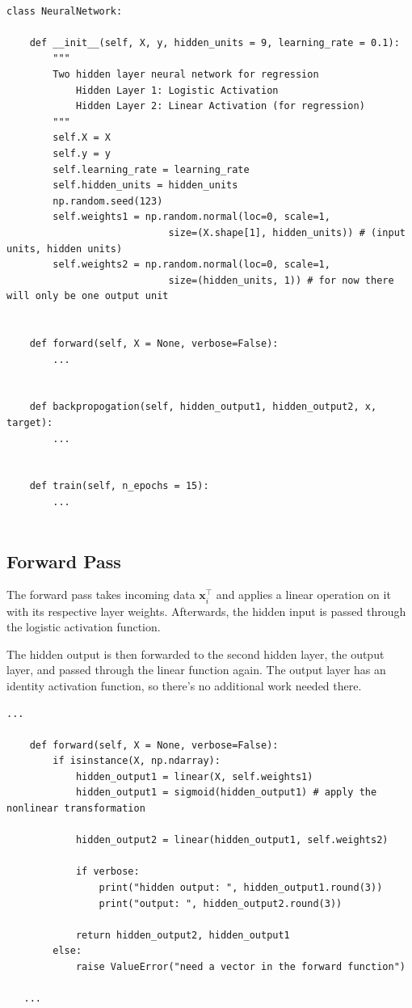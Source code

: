 \documentclass[12pt]{article}%
\begin{document}
\begin{lstlisting}

class NeuralNetwork:

    def __init__(self, X, y, hidden_units = 9, learning_rate = 0.1):
        """
        Two hidden layer neural network for regression
            Hidden Layer 1: Logistic Activation
            Hidden Layer 2: Linear Activation (for regression)
        """
        self.X = X
        self.y = y
        self.learning_rate = learning_rate
        self.hidden_units = hidden_units
        np.random.seed(123)
        self.weights1 = np.random.normal(loc=0, scale=1, 
                            size=(X.shape[1], hidden_units)) # (input units, hidden units)
        self.weights2 = np.random.normal(loc=0, scale=1, 
                            size=(hidden_units, 1)) # for now there will only be one output unit


    def forward(self, X = None, verbose=False):
		...


    def backpropogation(self, hidden_output1, hidden_output2, x, target):
		...


    def train(self, n_epochs = 15):
    	...
    	

\end{lstlisting}



\subsection{Forward Pass}

The forward pass takes incoming data $\mathbf{x}^\intercal_i$ and applies a linear operation on it with its respective layer weights. Afterwards, the hidden input is passed through the logistic activation function.

The hidden output is then forwarded to the second hidden layer, the output layer, and passed through the linear function again. The output layer has an identity activation function, so there's no additional work needed there.


\begin{lstlisting}
...
	
    def forward(self, X = None, verbose=False):
        if isinstance(X, np.ndarray):
            hidden_output1 = linear(X, self.weights1)
            hidden_output1 = sigmoid(hidden_output1) # apply the nonlinear transformation

            hidden_output2 = linear(hidden_output1, self.weights2)

            if verbose:
                print("hidden output: ", hidden_output1.round(3))
                print("output: ", hidden_output2.round(3))

            return hidden_output2, hidden_output1
        else:
            raise ValueError("need a vector in the forward function")
   
   ...         
\end{lstlisting}
\end{document}
